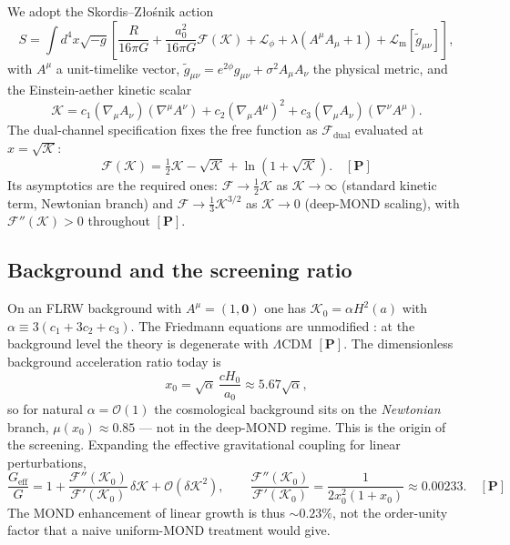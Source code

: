 \documentclass[aps,prd,preprint,superscriptaddress,nofootinbib,amsmath,amssymb,floatfix]{revtex4-2}
\begin{document}
We adopt the Skordis--Z\l{}o\'snik action \cite{SkordisZlosnik2021}
\begin{equation}
\label{eq:rmond}
S = \int d^4x\sqrt{-g}\left[\frac{R}{16\pi G} + \frac{a_0^2}{16\pi G}\mathcal{F}(\mathcal{K}) + \mathcal{L}_\phi + \lambda(A^\mu A_\mu + 1) + \mathcal{L}_{\text{m}}[\tilde g_{\mu\nu}]\right],
\end{equation}
with $A^\mu$ a unit-timelike vector, $\tilde g_{\mu\nu} = e^{2\phi}g_{\mu\nu} + \sigma^2 A_\mu A_\nu$ the physical metric, and the Einstein-aether kinetic scalar
\begin{equation}
\mathcal{K} = c_1(\nabla_\mu A_\nu)(\nabla^\mu A^\nu) + c_2(\nabla_\mu A^\mu)^2 + c_3(\nabla_\mu A_\nu)(\nabla^\nu A^\mu).
\end{equation}
The dual-channel specification fixes the free function as $\mathcal{F}_{\text{dual}}$ evaluated at $x = \sqrt{\mathcal{K}}$:
\begin{equation}
\label{eq:Fk}
\mathcal{F}(\mathcal{K}) = \tfrac{1}{2}\mathcal{K} - \sqrt{\mathcal{K}} + \ln\!\left(1+\sqrt{\mathcal{K}}\right). \quad \mathbf{[P]}
\end{equation}
Its asymptotics are the required ones: $\mathcal{F}\to\tfrac{1}{2}\mathcal{K}$ as $\mathcal{K}\to\infty$ (standard kinetic term, Newtonian branch) and $\mathcal{F}\to\tfrac{1}{3}\mathcal{K}^{3/2}$ as $\mathcal{K}\to0$ (deep-MOND scaling), with $\mathcal{F}''(\mathcal{K})>0$ throughout $\mathbf{[P]}$.

\subsection{Background and the screening ratio}

On an FLRW background with $A^\mu = (1,\mathbf{0})$ one has $\mathcal{K}_0 = \alpha H^2(a)$ with $\alpha \equiv 3(c_1+3c_2+c_3)$. The Friedmann equations are unmodified \cite{Thomas2023}: at the background level the theory is degenerate with $\Lambda$CDM $\mathbf{[P]}$. The dimensionless background acceleration ratio today is
\begin{equation}
x_0 = \sqrt{\alpha}\,\frac{cH_0}{a_0} \approx 5.67\sqrt{\alpha},
\end{equation}
so for natural $\alpha = \mathcal{O}(1)$ the cosmological background sits on the \emph{Newtonian} branch, $\mu(x_0)\approx0.85$ --- not in the deep-MOND regime. This is the origin of the screening. Expanding the effective gravitational coupling for linear perturbations,
\begin{equation}
\frac{G_{\text{eff}}}{G} = 1 + \frac{\mathcal{F}''(\mathcal{K}_0)}{\mathcal{F}'(\mathcal{K}_0)}\,\delta\mathcal{K} + \mathcal{O}(\delta\mathcal{K}^2),
\qquad \frac{\mathcal{F}''(\mathcal{K}_0)}{\mathcal{F}'(\mathcal{K}_0)} = \frac{1}{2x_0^2(1+x_0)} \approx 0.00233 . \quad \mathbf{[P]}
\end{equation}
The MOND enhancement of linear growth is thus $\sim0.23\%$, not the order-unity factor that a naive uniform-MOND treatment would give.
\end{document}
